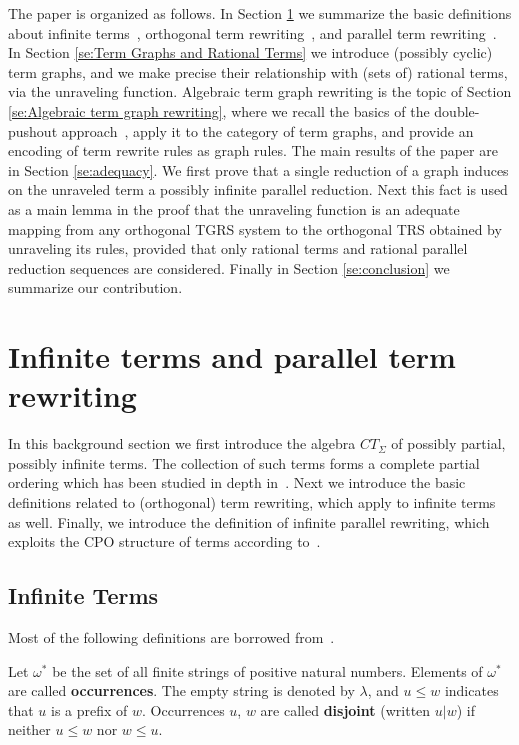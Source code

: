 \documentclass{eptcs}
\theoremstyle{plain}
\theoremstyle{definition}
\begin{document}
The paper is organized as follows. In Section 
\ref{se:term rewriting} we summarize the basic definitions about
infinite  terms~\cite{ADJ:IASCA}, orthogonal term rewriting~\cite{HL:CORS1},
and  parallel term rewriting~\cite{Cor:TRC}. 
In Section \ref{se:Term Graphs and Rational Terms} we introduce 
(possibly cyclic)
term graphs, and we make precise their relationship with (sets of)
rational terms, via the unraveling function. 
Algebraic term graph rewriting is the topic of Section
\ref{se:Algebraic term  graph rewriting}, where we recall the basics
of the  double-pushout approach~\cite{Ehr:TIAA}, apply it to the category
of term  graphs, and provide an encoding of term rewrite rules as
graph  rules. The main results of the paper are in Section
\ref{se:adequacy}.  We first prove that a single reduction of a graph
induces on the unraveled term a possibly infinite parallel
reduction. Next this fact is used as a main lemma in the proof that
the unraveling function is an adequate mapping from any orthogonal
TGRS system to the orthogonal TRS obtained by unraveling its rules,
provided that only rational terms and rational parallel  reduction
sequences  are considered.    
Finally in Section \ref{se:conclusion} we summarize our contribution.



\section{Infinite terms and parallel term rewriting}
\label{se:term rewriting}

In this background section we first introduce the algebra $CT_\Sigma$ 
of  
possibly partial, possibly 
infinite terms. The collection of such terms forms a 
complete partial ordering which has been studied in depth in~\cite{ADJ:IASCA}. Next we introduce the basic definitions related to 
(orthogonal) term rewriting, which apply to infinite terms as well. 
Finally, we introduce the definition of 
infinite parallel rewriting, which exploits the CPO structure of terms 
according to~\cite{Cor:TRC}.


\subsection{Infinite Terms}
\label{ss:Infinite Terms}

Most of the following definitions are borrowed from~\cite{ADJ:IASCA}.

Let $\omega^*$ be the set of all finite strings of
positive natural numbers. Elements of $\omega^*$ are called {\bf 
occurrences}.
The empty string is denoted by $\lambda$, and $u \le w$ indicates that 
$u$ is a prefix of $w$. 
Occurrences
$u$, $w$ are called {\bf disjoint} (written $u | w$) if neither $u \le 
w$
nor $w \le u$. 
\end{document}
